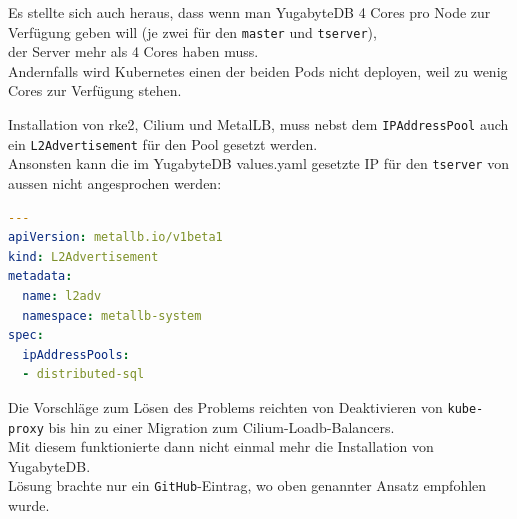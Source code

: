 \begin{flushleft}
    Es stellte sich auch heraus, dass wenn man YugabyteDB 4 Cores pro Node zur Verfügung geben will (je zwei für den \texttt{master} und \texttt{tserver}),\\
    der Server mehr als 4 Cores haben muss.\\
    Andernfalls wird Kubernetes einen der beiden Pods nicht deployen, weil zu wenig Cores zur Verfügung stehen.
\end{flushleft}
\begin{flushleft}
    Installation von \gls{rke2}, \Gls{Cilium} und \Gls{MetalLB}, muss nebst dem \texttt{IPAddressPool} auch ein \texttt{L2Advertisement} für den Pool gesetzt werden.\\
    Ansonsten kann die im YugabyteDB values.yaml gesetzte IP für den \texttt{tserver} von aussen nicht angesprochen werden:
    \lstset{style=gra_codestyle}
    \begin{lstlisting}[language=yaml, caption=metallb - Konfig YAML - Detail L2Advertisement,captionpos=b,label={lst:metallb-l2advertisement-setting},breaklines=true]
---
apiVersion: metallb.io/v1beta1
kind: L2Advertisement
metadata:
  name: l2adv
  namespace: metallb-system
spec:
  ipAddressPools:
  - distributed-sql
    \end{lstlisting}
    Die Vorschläge zum Lösen des Problems reichten von Deaktivieren von \texttt{kube-proxy} bis hin zu einer Migration zum \Gls{Cilium}-Loadb-Balancers.\\
    Mit diesem funktionierte dann nicht einmal mehr die Installation von YugabyteDB.\\
    Lösung brachte nur ein \texttt{GitHub}-Eintrag\cite{D4IZIEFN}, wo oben genannter Ansatz empfohlen wurde.
\end{flushleft}
